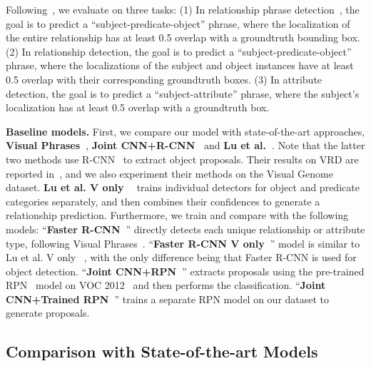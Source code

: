 \documentclass[10pt,twocolumn,letterpaper]{article}
\begin{document}
Following~\cite{lu2016visual}, we evaluate on three tasks: (1) In relationship phrase detection~\cite{sadeghi2011recognition}, the goal is to predict a ``subject-predicate-object'' phrase, where the localization of the entire relationship has at least 0.5 overlap with a groundtruth bounding box. (2) In relationship detection, the goal is to predict a ``subject-predicate-object'' phrase, where the localizations of the subject and object instances have at least 0.5 overlap with their corresponding groundtruth boxes. (3) In attribute detection, the goal is to predict a ``subject-attribute'' phrase, where the subject's localization has at least 0.5 overlap with a groundtruth box.

\textbf{Baseline models.} First, we compare our model with {state-of-the-art} approaches, \textbf{Visual Phrases~\cite{sadeghi2011recognition}}, \textbf{Joint CNN+R-CNN~\cite{simonyan2014very}} and \textbf{Lu et al.~\cite{lu2016visual}}. {Note that the latter two methods use R-CNN~\cite{girshick2014rich} to extract object proposals.} Their results on VRD are reported in~\cite{lu2016visual}, and we also experiment their methods on the Visual Genome dataset. \textbf{Lu et al. V only ~\cite{lu2016visual}} {trains} individual detectors for object and predicate categories separately, and then {combines} their confidences to generate {a} relationship prediction. Furthermore, we train and compare with the following models: ``\textbf{Faster R-CNN~\cite{ren2015faster}}'' directly detects each unique relationship or attribute type, following Visual Phrases~\cite{sadeghi2011recognition}. ``\textbf{Faster R-CNN V only~\cite{ren2015faster}}'' model is similar to {Lu et al. V only ~\cite{lu2016visual}}, with the only difference being that Faster R-CNN is used for object detection. ``\textbf{Joint CNN+RPN~\cite{simonyan2014very}}'' extracts proposals using the pre-trained RPN~\cite{ren2015faster} model on VOC 2012~\cite{everingham2010pascal} and then performs the classification. ``\textbf{Joint CNN+Trained RPN~\cite{ren2015faster}}'' trains a separate RPN model on our dataset to generate proposals.


\subsection{Comparison with State-of-the-art Models} 
\end{document}
